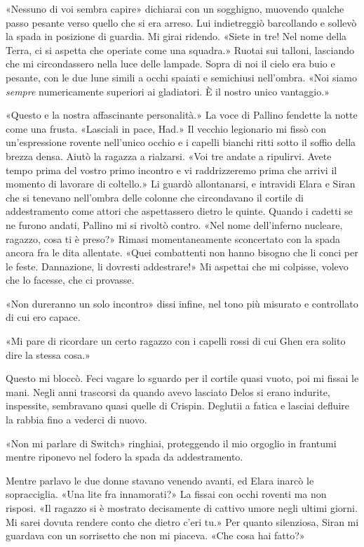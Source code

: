 «Nessuno di voi sembra capire» dichiarai con un sogghigno, muovendo
qualche passo pesante verso quello che si era arreso. Lui indietreggiò
barcollando e sollevò la spada in posizione di guardia. Mi girai
ridendo. «Siete in tre! Nel nome della Terra, ci si aspetta che operiate
come una squadra.» Ruotai sui talloni, lasciando che mi circondassero
nella luce delle lampade. Sopra di noi il cielo era buio e pesante, con
le due lune simili a occhi spaiati e semichiusi nell'ombra. «Noi siamo
\emph{sempre} numericamente superiori ai gladiatori. È il nostro unico
vantaggio.»

«Questo e la nostra affascinante personalità.» La voce di Pallino
fendette la notte come una frusta. «Lasciali in pace, Had.» Il vecchio
legionario mi fissò con un'espressione rovente nell'unico occhio e i
capelli bianchi ritti sotto il soffio della brezza densa. Aiutò la
ragazza a rialzarsi. «Voi tre andate a ripulirvi. Avete tempo prima del
vostro primo incontro e vi raddrizzeremo prima che arrivi il momento di
lavorare di coltello.» Li guardò allontanarsi, e intravidi Elara e Siran
che si tenevano nell'ombra delle colonne che circondavano il cortile di
addestramento come attori che {aspettassero} dietro le quinte. Quando i
cadetti se ne furono andati, Pallino mi si rivoltò contro. «Nel nome
dell'inferno nucleare, ragazzo, cosa ti è preso?» Rimasi momentaneamente
sconcertato con la spada ancora fra le dita allentate. «Quei combattenti
non hanno bisogno che li conci per le feste. Dannazione, li dovresti
addestrare!» Mi aspettai che mi colpisse, volevo che lo facesse, che ci
provasse.

«Non dureranno un solo incontro» dissi infine, nel tono più misurato e
controllato di cui ero capace.

«Mi pare di ricordare un certo ragazzo con i capelli rossi di cui Ghen
era solito dire la stessa cosa.»

Questo mi bloccò. Feci vagare lo sguardo per il cortile quasi vuoto, poi
mi fissai le mani. Negli anni trascorsi da quando avevo lasciato Delos
si erano indurite, inspessite, sembravano quasi quelle di Crispin.
Deglutii a fatica e lasciai defluire la rabbia fino a vederci di nuovo.

«Non mi parlare di Switch» ringhiai, proteggendo il mio orgoglio in
frantumi mentre riponevo nel fodero la spada da addestramento.

Mentre parlavo le due donne stavano venendo avanti, ed Elara inarcò le
sopracciglia. «Una lite fra innamorati?» La fissai con occhi roventi ma
non risposi. «Il ragazzo si è mostrato decisamente di cattivo umore
negli ultimi giorni. Mi sarei dovuta rendere conto che dietro c'eri tu.»
Per quanto silenziosa, Siran mi guardava con un sorrisetto che non mi
piaceva. «Che cosa hai fatto?»

